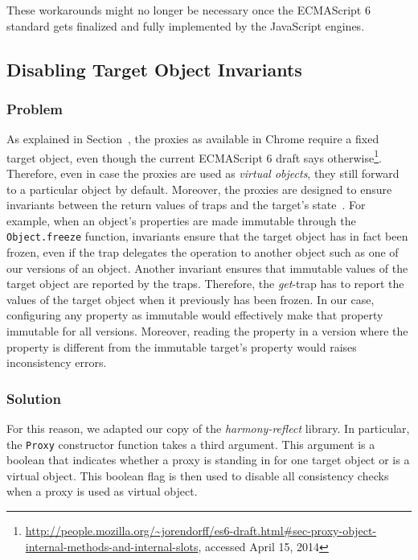 These workarounds might no longer be necessary once the ECMAScript 6 standard gets finalized and fully implemented by the JavaScript engines. 


\subsection{Disabling Target Object Invariants}

\subsubsection{Problem}
As explained in Section~\label{subsec:IMPLEMENTATION:1.1}, the proxies as available in Chrome require a fixed target object, even though the current ECMAScript 6 draft says otherwise\footnote{\url{http://people.mozilla.org/~jorendorff/es6-draft.html\#sec-proxy-object-internal-methods-and-internal-slots}, accessed April 15, 2014}.
Therefore, even in case the proxies are used as \emph{virtual objects}, they still forward to a particular object by default.
Moreover, the proxies are designed to ensure invariants between the return values of traps and the target's state~\cite{Cutsem2013TRP}.
For example, when an object's properties are made immutable through the \lstinline{Object.freeze} function, invariants ensure that the target object has in fact been frozen, even if the trap delegates the operation to another object such as one of our versions of an object.
Another invariant ensures that immutable values of the target object are reported by the traps.
Therefore, the \emph{get}-trap has to report the values of the target object when it previously has been frozen.
In our case, configuring any property as immutable would effectively make that property immutable for all versions.
Moreover, reading the property in a version where the property is different from the immutable target's property would raises inconsistency errors.

\subsubsection{Solution}
For this reason, we adapted our copy of the \emph{harmony-reflect} library.
In particular, the \lstinline{Proxy} constructor function takes a third argument.
This argument is a boolean that indicates whether a proxy is standing in for one target object or is a virtual object.
This boolean flag is then used to disable all consistency checks when a proxy is used as virtual object.


